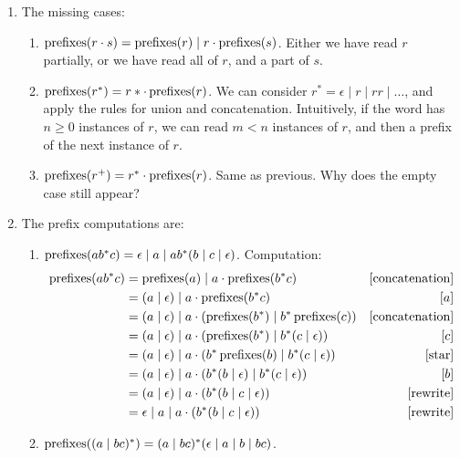 \begin{exercise}{}
\begin{solution}
    \begin{enumerate}
      \item The missing cases:
      \begin{enumerate}
        \item \(\operatorname{prefixes}(r \cdot s) = \operatorname{prefixes}(r) \mid r \cdot \operatorname{prefixes}(s)\).
        Either we have read \(r\) partially, or we have read all of \(r\), and a
        part of \(s\).
        \item \(\operatorname{prefixes}(r^*) = r*\cdot\operatorname{prefixes}(r)\). We can
        consider \(r^* = \epsilon \mid r \mid rr \mid \ldots\), and apply the
        rules for union and concatenation. Intuitively, if the word has \(n \ge
        0\) instances of \(r\), we can read \(m < n\) instances of \(r\), and
        then a prefix of the next instance of \(r\).
        \item \(\operatorname{prefixes}(r^+) = r^* \cdot \operatorname{prefixes}(r)\). Same as
        previous. Why does the empty case still appear?
      \end{enumerate}
      \item The prefix computations are:
      \begin{enumerate}
        \item \(\operatorname{prefixes}(ab^*c) = \epsilon \mid a \mid ab^*(b \mid c \mid \epsilon)\). Computation:
        \begin{align*}
          \operatorname{prefixes}(ab^*c) &= \operatorname{prefixes}(a) \mid a\cdot\operatorname{prefixes}(b^*c) & [\text{concatenation}]\\
                           &= (a \mid \epsilon) \mid a\cdot\operatorname{prefixes}(b^*c) &[a]\\
                           &= (a \mid \epsilon) \mid a\cdot(\operatorname{prefixes}(b^*) \mid b^*\operatorname{prefixes}(c)) &[\text{concatenation}]\\
                           &= (a \mid \epsilon) \mid a\cdot(\operatorname{prefixes}(b^*) \mid b^*(c \mid \epsilon)) &[c]\\
                           &= (a \mid \epsilon) \mid a\cdot(b^*\operatorname{prefixes}(b) \mid b^*(c \mid \epsilon)) &[\text{star}]\\
                           &= (a \mid \epsilon) \mid a\cdot(b^*(b \mid \epsilon) \mid b^*(c \mid \epsilon)) &[b]\\
                           &= (a \mid \epsilon) \mid a\cdot(b^*(b \mid c \mid \epsilon)) &[\text{rewrite}]\\
                           &= \epsilon \mid a \mid a\cdot(b^*(b \mid c \mid \epsilon)) & [\text{rewrite}]\\
        \end{align*}
        \item \(\operatorname{prefixes}((a \mid bc)^*) = (a \mid bc)^*(\epsilon \mid a \mid b \mid bc)\).
      \end{enumerate}
    \end{enumerate}
  \end{solution}
  
\end{exercise}
